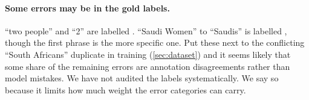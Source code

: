\paragraph{Some errors may be in the gold labels.}
``two people'' and ``2'' are labelled \NO{}. ``Saudi Women'' to ``Saudis'' is labelled \BW{}, though the first phrase is the more specific one. Put these next to the conflicting ``South Africans'' duplicate in training (\cref{sec:dataset}) and it seems likely that some share of the remaining errors are annotation disagreements rather than model mistakes. We have not audited the labels systematically. We say so because it limits how much weight the error categories can carry.
